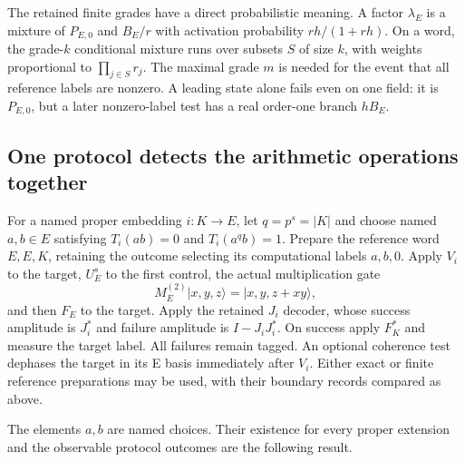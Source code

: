 The retained finite grades have a direct probabilistic meaning. A factor
$\lambda_E$ is a mixture of $P_{E,0}$ and $B_E/r$ with activation
probability $rh/(1+rh)$. On a word, the grade-$k$ conditional mixture runs
over subsets $S$ of size $k$, with weights proportional to $\prod_{j\in S}r_j$.
The maximal grade $m$ is needed for the event that all reference labels
are nonzero. A leading state alone fails even on one field: it is $P_{E,0}$,
but a later nonzero-label test has a real order-one branch $hB_E$.

\subsection{One protocol detects the arithmetic operations together}

\begin{definition}
For a named proper embedding $i:K\to E$, let $q=p^s=|K|$ and choose
named $a,b\in E$ satisfying $T_i(ab)=0$ and $T_i(a^qb)=1$.
Prepare the reference word $E,E,K$, retaining the outcome selecting its
computational labels $a,b,0$. Apply $V_i$ to the target, $U_E^s$ to the
first control, the actual multiplication gate
\[
 M_E^{(2)}|x,y,z\rangle=|x,y,z+xy\rangle,
\]
and then $F_E$ to the target. Apply the retained $J_i$ decoder, whose
success amplitude is $J_i^*$ and failure amplitude is $I-J_iJ_i^*$.
On success apply $F_K^*$ and measure the target label. All failures remain
tagged. An optional coherence test dephases the target in its E basis
immediately after $V_i$. Either exact or finite reference preparations
may be used, with their boundary records compared as above.
\end{definition}
\begin{scope}
The elements $a,b$ are named choices. Their existence for every proper
extension and the observable protocol outcomes are the following result.
\end{scope}

